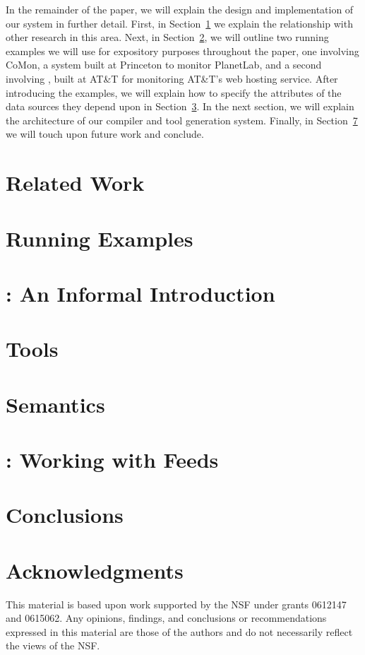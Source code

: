 \documentclass[nocopyrightspace]{sigplanconf}
\begin{document}
In the remainder of the paper, we will explain the design and
implementation of our system in further detail.  First, in Section~\ref{sec:related}
we explain the relationship with other research in this area.  Next, in Section~\ref{sec:examples},
we will outline two running examples we will use for expository purposes throughout the paper, one 
involving CoMon, a system built at Princeton to monitor PlanetLab, and a second involving
\ningaui{}, built at AT\&T for monitoring AT\&T's web hosting service.  After introducing the examples,
we will explain how to specify the attributes of the data sources they depend upon in 
Section~\ref{sec:informal}.  In the next section, we will explain the architecture of our compiler
and tool generation system.  Finally, in Section~\ref{sec:conclusions} we will touch upon future work
and conclude.

\section{Related Work}
\label{sec:related}


\section{Running Examples}
\label{sec:examples}


\section{\padsd{}: An Informal Introduction}
\label{sec:informal}


\section{\padsd{} Tools}
\label{sec:tools}


\section{\padsd{} Semantics}
\label{sec:semantics}


\section{\padsd{}:  Working with Feeds}
\label{sec:programming}


\section{Conclusions}
\label{sec:conclusions}

\section*{Acknowledgments}

This material is based upon work 
supported by the NSF
   under grants 0612147 and 0615062.
Any opinions, findings, and conclusions or recommendations
   expressed in this material are those of the authors and do not
   necessarily reflect the views of the NSF.



\end{document}
